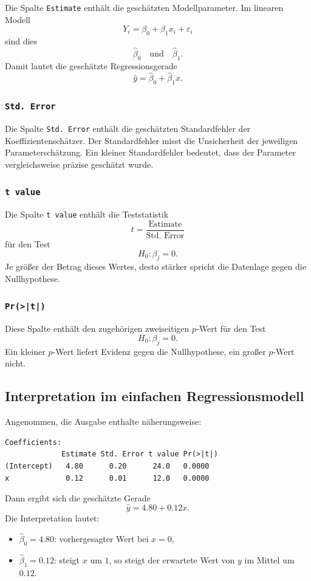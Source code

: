 \documentclass[10pt, letterpaper]{article}
\begin{document}
Die Spalte \texttt{Estimate} enthält die geschätzten Modellparameter. Im linearen Modell
\[
Y_i=\beta_0+\beta_1 x_i+\varepsilon_i
\]
sind dies
\[
\hat\beta_0 \quad \text{und} \quad \hat\beta_1.
\]
Damit lautet die geschätzte Regressionsgerade
\[
\hat y=\hat\beta_0+\hat\beta_1 x.
\]

\subsubsection{\texttt{Std. Error}}

Die Spalte \texttt{Std. Error} enthält die geschätzten Standardfehler der Koeffizientenschätzer. Der Standardfehler misst die Unsicherheit der jeweiligen Parameterschätzung. Ein kleiner Standardfehler bedeutet, dass der Parameter vergleichsweise präzise geschätzt wurde.

\subsubsection{\texttt{t value}}

Die Spalte \texttt{t value} enthält die Teststatistik
\[
t=\frac{\text{Estimate}}{\text{Std. Error}}
\]
für den Test
\[
H_0:\beta_j=0.
\]
Je größer der Betrag dieses Wertes, desto stärker spricht die Datenlage gegen die Nullhypothese.

\subsubsection{\texttt{Pr(>|t|)}}

Diese Spalte enthält den zugehörigen zweiseitigen \(p\)-Wert für den Test
\[
H_0:\beta_j=0.
\]
Ein kleiner \(p\)-Wert liefert Evidenz gegen die Nullhypothese, ein großer \(p\)-Wert nicht.

\subsection{Interpretation im einfachen Regressionsmodell}

Angenommen, die Ausgabe enthalte näherungsweise:
\begin{verbatim}
Coefficients:
             Estimate Std. Error t value Pr(>|t|)
(Intercept)   4.80      0.20      24.0   0.0000
x             0.12      0.01      12.0   0.0000
\end{verbatim}
Dann ergibt sich die geschätzte Gerade
\[
\hat y=4.80+0.12x.
\]
Die Interpretation lautet:
\begin{itemize}
    \item \(\hat\beta_0=4.80\): vorhergesagter Wert bei \(x=0\),
    \item \(\hat\beta_1=0.12\): steigt \(x\) um \(1\), so steigt der erwartete Wert von \(y\) im Mittel um \(0.12\).
\end{itemize}
\end{document}
